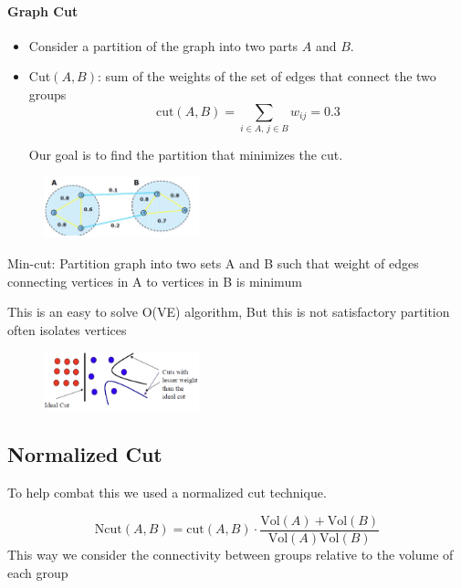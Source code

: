 \documentclass[11pt]{article}
\begin{document}
\pagebreak

\paragraph*{Graph Cut}


\begin{itemize}
	\item Consider a partition of the graph into two parts \( A \) and \( B \).

	\item Cut\((A, B)\): sum of the weights of the set of edges that connect the two groups
	      \[
		      \text{cut}(A, B) = \sum_{i \in A,\, j \in B} w_{ij} = 0.3
	      \]

	      Our goal is to find the partition that minimizes the cut.

\end{itemize}

\begin{figure}[!ht]
	\centering
	\includegraphics[width=0.4\textwidth]{../imgs/gcut} %
\end{figure}

Min-cut: Partition graph into two sets A and B such that weight of edges
connecting vertices in A to vertices in B is minimum

This is an easy to solve O(VE) algorithm, But this is not satisfactory partition often isolates vertices

\begin{figure}[!ht]
	\centering
	\includegraphics[width=0.4\textwidth]{../imgs/mincutissues.png} %
\end{figure}

\subsection*{Normalized Cut}
To help combat this we used a normalized cut technique.

\[
	\text{Ncut}(A, B) = \text{cut}(A, B) \cdot \frac{\text{Vol}(A) + \text{Vol}(B)}{\text{Vol}(A)\text{Vol}(B)}
\]
This way we consider the connectivity between groups relative to the volume of each group
\end{document}
